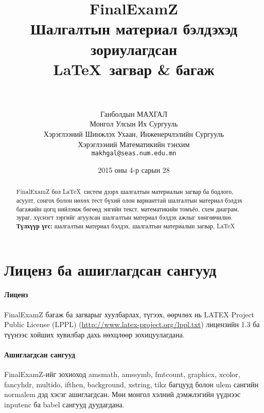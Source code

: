 \documentclass[10pt]{article}
\theoremstyle{definition}
\begin{document}
\title{
  {\Huge FinalExamZ} \\[2mm] Шалгалтын материал бэлдэхэд зориулагдсан \\ \LaTeX\, загвар \& багаж \\[2mm] \large\version \\[2mm] \normalsize \svn}
\author{
  Ганболдын МАХГАЛ\\
  Монгол Улсын Их Сургууль\\
  Хэрэглээний Шинжлэх Ухаан, Инженерчлэлийн Сургууль\\
  Хэрэглээний Математикийн тэнхим\\[2mm]
  \texttt{makhgal@seas.num.edu.mn} \\[2mm]
  \www}
\newcommand{\version}{v1.1.0}
\newcommand{\www}{\url{http://www.galaa.mn/}}
\newcommand{\svn}{\url{https://github.com/galaamn/FinalExamZ}}
\date{2015 оны 4-р сарын 28}
\maketitle

\begin{abstract}
FinalExamZ бол \LaTeX\, систем дээрх шалгалтын материалын загвар ба бодлого, асуулт, сонгох болон нөхөх тест бүхий олон варианттай шалгалтын материал бэлдэх багажийн цогц нийлэмж бөгөөд энгийн текст, математикийн томъёо, схем диаграм, зураг, хүснэгт зэргийг агуулсан шалгалтын материал бэлдэх ажлыг хөнгөвчилнө.\\[2mm]
\textbf{Түлхүүр үгс:} шалгалтын материал бэлдэх, шалгалтын материалын загвар, \LaTeX
\end{abstract}

\tableofcontents

\section{Лиценз ба ашиглагдсан сангууд}\label{license}

\paragraph{Лиценз} FinalExamZ багаж ба загварыг хуулбарлах, түгээх, өөрчлөх нь LATEX Project Public License (LPPL) (\url{http://www.latex-project.org/lppl.txt}) лицензийн 1.3 ба түүнээс хойших хувилбар дахь нөхцлөөр зохицуулагдана.

\paragraph{Ашиглагдсан сангууд} FinalExamZ-ийг зохиоход amsmath, amssymb, fmtcount, graphicx, xcolor, fancyhdr, multido, ifthen, background, xstring, tikz багцууд болон ulem сангийн normalem дэд хэсэг ашиглагдсан. Мөн монгол хэлний дэмжлэгийн үүднээс inputenc ба babel сангууд дуудагдана.
\end{document}
